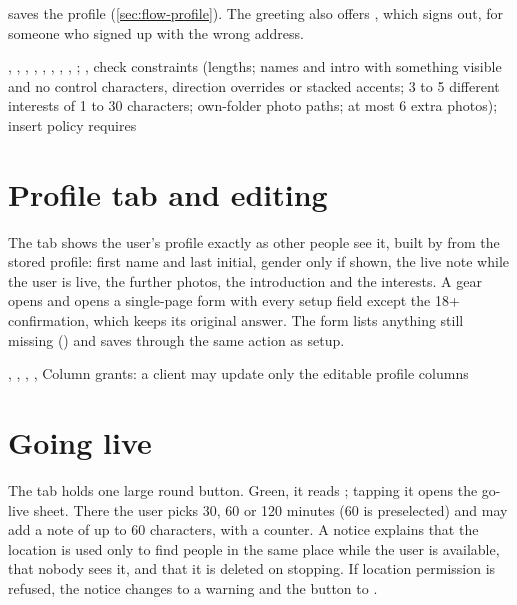  saves the profile (\cref{sec:flow-profile}). The greeting also offers
, which signs out, for someone who signed up with the wrong address.

\implemented
  {, , , , , , }
  {, , ; , }
  { check constraints (lengths; names and intro with something visible and no control characters, direction overrides or stacked accents; 3 to 5 different interests of 1 to 30 characters; own-folder photo paths; at most 6 extra photos); insert policy requires }

\section{Profile tab and editing}

The  tab shows the user's profile exactly as other people see it, built by
 from the stored profile: first name and last initial, gender only if shown, the live
note while the user is live, the further photos, the introduction and the interests. A gear opens
 and  opens a single-page form with every setup field except the 18+
confirmation, which keeps its original answer. The form lists anything still missing () and saves through the same action as setup.

\implemented
  {, }
  {, , , }
  {Column grants: a client may update only the editable profile columns}

\section{Going live}
\label{sec:feature-live}

The  tab holds one large round button. Green, it reads ; tapping it opens the go-live
sheet. There the user picks 30, 60 or 120 minutes (60 is preselected) and may add a note of up to 60
characters, with a counter. A notice explains that the location is used only to find people in the same
place while the user is available, that nobody sees it, and that it is deleted on stopping. If location
permission is refused, the notice changes to a warning and the button to .

